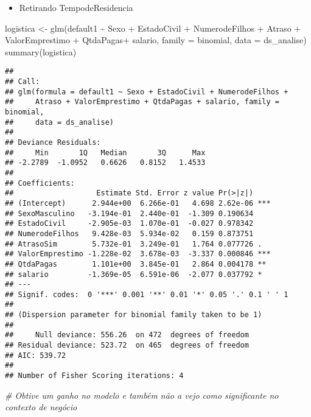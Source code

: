 \documentclass[
]{article}
\newenvironment{Shaded}{\begin{snugshade}}{\end{snugshade}}
\newcommand{\AttributeTok}[1]{\textcolor[rgb]{0.77,0.63,0.00}{#1}}
\newcommand{\CommentTok}[1]{\textcolor[rgb]{0.56,0.35,0.01}{\textit{#1}}}
\newcommand{\FunctionTok}[1]{\textcolor[rgb]{0.00,0.00,0.00}{#1}}
\newcommand{\NormalTok}[1]{#1}
\newcommand{\OtherTok}[1]{\textcolor[rgb]{0.56,0.35,0.01}{#1}}
\newcommand{\SpecialCharTok}[1]{\textcolor[rgb]{0.00,0.00,0.00}{#1}}
\providecommand{\tightlist}{%
  \setlength{\itemsep}{0pt}\setlength{\parskip}{0pt}}
\begin{document}
\begin{itemize}
\tightlist
\item
  Retirando TempodeResidencia
\end{itemize}

\begin{Shaded}
\begin{Highlighting}[]
\NormalTok{logistica }\OtherTok{\textless{}{-}} \FunctionTok{glm}\NormalTok{(default1 }\SpecialCharTok{\textasciitilde{}}\NormalTok{ Sexo }\SpecialCharTok{+} 
\NormalTok{                            EstadoCivil }\SpecialCharTok{+} 
\NormalTok{                            NumerodeFilhos }\SpecialCharTok{+} 
\NormalTok{                            Atraso }\SpecialCharTok{+} 
\NormalTok{                            ValorEmprestimo }\SpecialCharTok{+}
\NormalTok{                            QtdaPagas}\SpecialCharTok{+} 
\NormalTok{                            salario, }\AttributeTok{family =}\NormalTok{ binomial, }\AttributeTok{data =}\NormalTok{ ds\_analise)}
\FunctionTok{summary}\NormalTok{(logistica)}
\end{Highlighting}
\end{Shaded}

\begin{verbatim}
## 
## Call:
## glm(formula = default1 ~ Sexo + EstadoCivil + NumerodeFilhos + 
##     Atraso + ValorEmprestimo + QtdaPagas + salario, family = binomial, 
##     data = ds_analise)
## 
## Deviance Residuals: 
##     Min       1Q   Median       3Q      Max  
## -2.2789  -1.0952   0.6626   0.8152   1.4533  
## 
## Coefficients:
##                   Estimate Std. Error z value Pr(>|z|)    
## (Intercept)      2.944e+00  6.266e-01   4.698 2.62e-06 ***
## SexoMasculino   -3.194e-01  2.440e-01  -1.309 0.190634    
## EstadoCivil     -2.905e-03  1.070e-01  -0.027 0.978342    
## NumerodeFilhos   9.428e-03  5.934e-02   0.159 0.873751    
## AtrasoSim        5.732e-01  3.249e-01   1.764 0.077726 .  
## ValorEmprestimo -1.228e-02  3.678e-03  -3.337 0.000846 ***
## QtdaPagas        1.101e+00  3.845e-01   2.864 0.004178 ** 
## salario         -1.369e-05  6.591e-06  -2.077 0.037792 *  
## ---
## Signif. codes:  0 '***' 0.001 '**' 0.01 '*' 0.05 '.' 0.1 ' ' 1
## 
## (Dispersion parameter for binomial family taken to be 1)
## 
##     Null deviance: 556.26  on 472  degrees of freedom
## Residual deviance: 523.72  on 465  degrees of freedom
## AIC: 539.72
## 
## Number of Fisher Scoring iterations: 4
\end{verbatim}

\begin{Shaded}
\begin{Highlighting}[]
\CommentTok{\# Obtive um ganho no modelo e também não a vejo como significante no contexto de negócio}
\end{Highlighting}
\end{Shaded}
\end{document}
